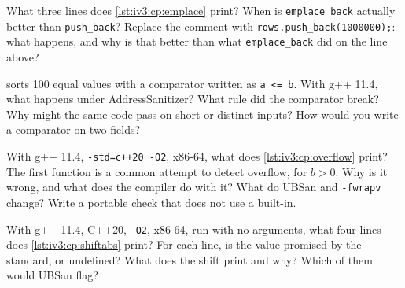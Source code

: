 \begin{question}\label{iq:iv3:cpp:29}
What three lines does \cref{lst:iv3:cp:emplace} print? When is \texttt{emplace\_back} actually better than \texttt{push\_back}? Replace the comment with \texttt{rows.push\_back(1000000);}: what happens, and why is that better than what \texttt{emplace\_back} did on the line above?
\label{lst:iv3:cp:emplace}
\end{question}

\begin{question}\label{iq:iv3:cpp:30}
 sorts 100 equal values with a comparator written as \texttt{a <= b}. With g++ 11.4, what happens under AddressSanitizer? What rule did the comparator break? Why might the same code pass on short or distinct inputs? How would you write a comparator on two fields?
\label{lst:iv3:cp:sortle}
\end{question}

\begin{question}\label{iq:iv3:cpp:31}
With g++ 11.4, \texttt{-std=c++20 -O2}, x86-64, what does \cref{lst:iv3:cp:overflow} print? The first function is a common attempt to detect overflow, for $b > 0$. Why is it wrong, and what does the compiler do with it? What do UBSan and \texttt{-fwrapv} change? Write a portable check that does not use a built-in.
\label{lst:iv3:cp:overflow}
\end{question}

\begin{question}\label{iq:iv3:cpp:32}
With g++ 11.4, C++20, \texttt{-O2}, x86-64, run with no arguments, what four lines does \cref{lst:iv3:cp:shiftabs} print? For each line, is the value promised by the standard, or undefined? What does the shift print and why? Which of them would UBSan flag?
\label{lst:iv3:cp:shiftabs}
\end{question}

